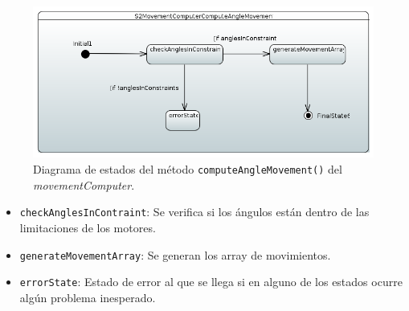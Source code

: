 \begin{figure}[H]
    \centering
    \includegraphics[width=1\linewidth]{pictures/S2MovementComputerComputeAngleMovement.PNG}
    \caption{Diagrama de estados del método \texttt{computeAngleMovement()} del \textit{movementComputer}.}
    \label{fig:fun_compute_angle_mocement_movement_computer}
\end{figure}

\begin{itemize}
    \item \texttt{checkAnglesInContraint}: Se verifica si los ángulos están dentro de las limitaciones de los motores.
    \item \texttt{generateMovementArray}: Se generan los array de movimientos.
    \item \texttt{errorState}: Estado de error al que se llega si en alguno de los estados ocurre algún problema inesperado. 
\end{itemize}